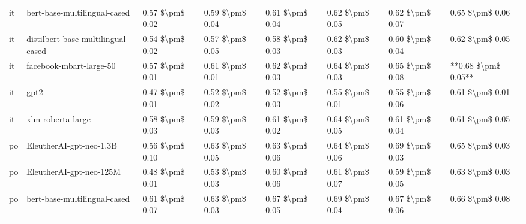 \begin{tabular}{llllllll}
      it &       bert-base-multilingual-cased & 0.57 \$\textbackslash pm\$ 0.02 &           0.59 \$\textbackslash pm\$ 0.04 &       0.61 \$\textbackslash pm\$ 0.04 &        0.62 \$\textbackslash pm\$ 0.05 &                         0.62 \$\textbackslash pm\$ 0.07 &     0.65 \$\textbackslash pm\$ 0.06 \\
      it & distilbert-base-multilingual-cased & 0.54 \$\textbackslash pm\$ 0.02 &           0.57 \$\textbackslash pm\$ 0.05 &       0.58 \$\textbackslash pm\$ 0.03 &        0.62 \$\textbackslash pm\$ 0.03 &                         0.60 \$\textbackslash pm\$ 0.04 &     0.62 \$\textbackslash pm\$ 0.05 \\
      it &            facebook-mbart-large-50 & 0.57 \$\textbackslash pm\$ 0.01 &           0.61 \$\textbackslash pm\$ 0.01 &       0.62 \$\textbackslash pm\$ 0.03 &        0.64 \$\textbackslash pm\$ 0.03 &                         0.65 \$\textbackslash pm\$ 0.08 & **0.68 \$\textbackslash pm\$ 0.05** \\
      it &                               gpt2 & 0.47 \$\textbackslash pm\$ 0.01 &           0.52 \$\textbackslash pm\$ 0.02 &       0.52 \$\textbackslash pm\$ 0.03 &        0.55 \$\textbackslash pm\$ 0.01 &                         0.55 \$\textbackslash pm\$ 0.06 &     0.61 \$\textbackslash pm\$ 0.01 \\
      it &                  xlm-roberta-large & 0.58 \$\textbackslash pm\$ 0.03 &           0.59 \$\textbackslash pm\$ 0.03 &       0.61 \$\textbackslash pm\$ 0.02 &        0.64 \$\textbackslash pm\$ 0.05 &                         0.61 \$\textbackslash pm\$ 0.04 &     0.61 \$\textbackslash pm\$ 0.05 \\
      po &            EleutherAI-gpt-neo-1.3B & 0.56 \$\textbackslash pm\$ 0.10 &           0.63 \$\textbackslash pm\$ 0.05 &       0.63 \$\textbackslash pm\$ 0.06 &        0.64 \$\textbackslash pm\$ 0.06 &                         0.69 \$\textbackslash pm\$ 0.03 &     0.65 \$\textbackslash pm\$ 0.03 \\
      po &            EleutherAI-gpt-neo-125M & 0.48 \$\textbackslash pm\$ 0.01 &           0.53 \$\textbackslash pm\$ 0.03 &       0.60 \$\textbackslash pm\$ 0.06 &        0.61 \$\textbackslash pm\$ 0.07 &                         0.59 \$\textbackslash pm\$ 0.05 &     0.63 \$\textbackslash pm\$ 0.03 \\
      po &       bert-base-multilingual-cased & 0.61 \$\textbackslash pm\$ 0.07 &           0.63 \$\textbackslash pm\$ 0.03 &       0.67 \$\textbackslash pm\$ 0.05 &        0.69 \$\textbackslash pm\$ 0.04 &                         0.67 \$\textbackslash pm\$ 0.06 &     0.66 \$\textbackslash pm\$ 0.08 \\

\end{tabular}
